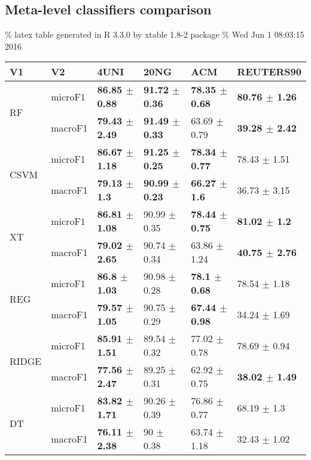 \documentclass[]{article}
\begin{document}
\subsection{Meta-level classifiers
comparison}\label{meta-level-classifiers-comparison}

\% latex table generated in R 3.3.0 by xtable 1.8-2 package \% Wed Jun 1
08:03:15 2016

\begin{table}[ht]
\centering
\begin{tabular}{llllll}
  \hline
V1 & V2 & 4UNI & 20NG & ACM & REUTERS90 \\ 
  \cline{3-6} \hline
\multirow{2}{*}{RF} & microF1 & \bf{86.85 $\pm$  0.88} & \bf{91.72 $\pm$  0.36} & \bf{78.35 $\pm$  0.68} & \bf{80.76 $\pm$  1.26} \\ 
   & macroF1 & \bf{79.43 $\pm$  2.49} & \bf{91.49 $\pm$  0.33} & 63.69 $\pm$  0.79 & \bf{39.28 $\pm$  2.42} \\ 
   \cline{3-6}\multirow{2}{*}{CSVM} & microF1 & \bf{86.67 $\pm$  1.18} & \bf{91.25 $\pm$  0.25} & \bf{78.34 $\pm$  0.77} & 78.43 $\pm$  1.51 \\ 
   & macroF1 & \bf{79.13 $\pm$  1.3} & \bf{90.99 $\pm$  0.23} & \bf{66.27 $\pm$  1.6} & 36.73 $\pm$  3.15 \\ 
   \cline{3-6}\multirow{2}{*}{XT} & microF1 & \bf{86.81 $\pm$  1.08} & 90.99 $\pm$  0.35 & \bf{78.44 $\pm$  0.75} & \bf{81.02 $\pm$  1.2} \\ 
   & macroF1 & \bf{79.02 $\pm$  2.65} & 90.74 $\pm$  0.34 & 63.86 $\pm$  1.24 & \bf{40.75 $\pm$  2.76} \\ 
   \cline{3-6}\multirow{2}{*}{REG} & microF1 & \bf{86.8 $\pm$  1.03} & 90.98 $\pm$  0.28 & \bf{78.1 $\pm$  0.68} & 78.54 $\pm$  1.18 \\ 
   & macroF1 & \bf{79.57 $\pm$  1.05} & 90.75 $\pm$  0.29 & \bf{67.44 $\pm$  0.98} & 34.24 $\pm$  1.69 \\ 
   \cline{3-6}\multirow{2}{*}{RIDGE} & microF1 & \bf{85.91 $\pm$  1.51} & 89.54 $\pm$  0.32 & 77.02 $\pm$  0.78 & 78.69 $\pm$  0.94 \\ 
   & macroF1 & \bf{77.56 $\pm$  2.47} & 89.25 $\pm$  0.31 & 62.92 $\pm$  0.75 & \bf{38.02 $\pm$  1.49} \\ 
   \cline{3-6}\multirow{2}{*}{DT} & microF1 & \bf{83.82 $\pm$  1.71} & 90.26 $\pm$  0.39 & 76.86 $\pm$  0.77 & 68.19 $\pm$  1.3 \\ 
   & macroF1 & \bf{76.11 $\pm$  2.38} & 90 $\pm$  0.38 & 63.74 $\pm$  1.18 & 32.43 $\pm$  1.02 \\ 

\end{tabular}
\end{table}
\end{document}
